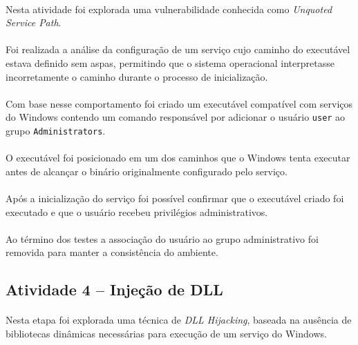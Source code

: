 \paragraph{}
Nesta atividade foi explorada uma vulnerabilidade conhecida como
\textit{Unquoted Service Path}.

\paragraph{}
Foi realizada a análise da configuração de um serviço cujo caminho do executável
estava definido sem aspas, permitindo que o sistema operacional interpretasse
incorretamente o caminho durante o processo de inicialização.

\paragraph{}
Com base nesse comportamento foi criado um executável compatível com serviços do
Windows contendo um comando responsável por adicionar o usuário
\texttt{user} ao grupo \texttt{Administrators}.

\paragraph{}
O executável foi posicionado em um dos caminhos que o Windows tenta executar
antes de alcançar o binário originalmente configurado pelo serviço.

\paragraph{}
Após a inicialização do serviço foi possível confirmar que o executável criado
foi executado e que o usuário recebeu privilégios administrativos.

\paragraph{}
Ao término dos testes a associação do usuário ao grupo administrativo foi
removida para manter a consistência do ambiente.

\subsection{Atividade 4 -- Injeção de DLL}

\paragraph{}
Nesta etapa foi explorada uma técnica de \textit{DLL Hijacking}, baseada na
ausência de bibliotecas dinâmicas necessárias para execução de um serviço do
Windows.

